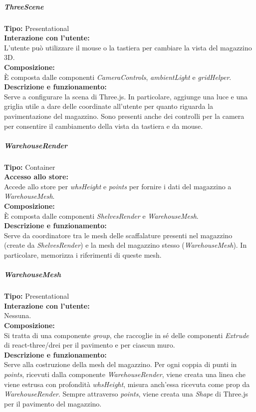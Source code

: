 \subparagraph{\colorbox{verde_uml}{ThreeScene}}
\textbf{Tipo:} Presentational \\
\textbf{Interazione con l'utente:} \\
L'utente può utilizzare il mouse o la tastiera per cambiare la vista del magazzino 3D.\\ 
\textbf{Composizione:} \\
È composta dalle componenti \textit{CameraControls}, \textit{ambientLight} e \textit{gridHelper}.\\
\textbf{Descrizione e funzionamento:} \\
Serve a configurare la scena di Three.js. In particolare, aggiunge una luce e una griglia utile a dare delle coordinate all'utente per quanto riguarda la pavimentazione del magazzino. Sono presenti anche dei controlli per la camera per consentire il cambiamento della vista da tastiera e da mouse.\\

\subparagraph{\colorbox{verde_uml}{WarehouseRender}}
\textbf{Tipo:} Container \\
\textbf{Accesso allo store:} \\
Accede allo store per \textit{whsHeight} e \textit{points} per fornire i dati del magazzino a \textit{WarehouseMesh}.\\
\textbf{Composizione:} \\
È composta dalle componenti \textit{ShelvesRender} e \textit{WarehouseMesh}.\\
\textbf{Descrizione e funzionamento:} \\
Serve da coordinatore tra le mesh delle scaffalature presenti nel magazzino (create da \textit{ShelvesRender}) e la mesh del magazzino stesso (\textit{WarehouseMesh}). In particolare, memorizza i riferimenti di queste mesh.

\subparagraph{\colorbox{verde_uml}{WarehouseMesh}}
\textbf{Tipo:} Presentational \\
\textbf{Interazione con l'utente:} \\
Nessuna.\\
\textbf{Composizione:} \\
Si tratta di una componente \textit{group}, che raccoglie in sé delle componenti \textit{Extrude} di react-three/drei per il pavimento e per ciascun muro. \\
\textbf{Descrizione e funzionamento:} \\
Serve alla costruzione della mesh del magazzino. Per ogni coppia di punti in \textit{points}, ricevuti dalla componente \textit{WarehouseRender}, viene creata una linea che viene estrusa con profondità \textit{whsHeight}, misura anch'essa ricevuta come prop da \textit{WarehouseRender}. Sempre attraverso \textit{points}, viene creata una \textit{Shape} di Three.js per il pavimento del magazzino.

